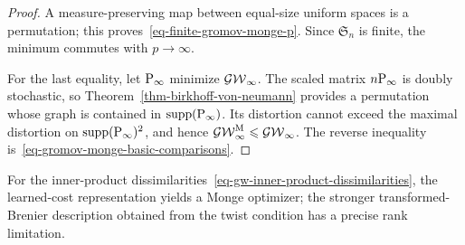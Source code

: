 \begin{proof}
A measure-preserving map between equal-size uniform spaces is a permutation; this proves~\eqref{eq-finite-gromov-monge-p}. Since $\mathfrak S_n$ is finite, the minimum commutes with $p\to\infty$.

For the last equality, let $\P_\infty$ minimize $\GW_\infty$. The scaled matrix $n\P_\infty$ is doubly stochastic, so Theorem~\ref{thm-birkhoff-von-neumann} provides a permutation whose graph is contained in $\supp(\P_\infty)$. Its distortion cannot exceed the maximal distortion on $\supp(\P_\infty)^2$, and hence $\GW_\infty^{\mathrm M}\leq\GW_\infty$. The reverse inequality is~\eqref{eq-gromov-monge-basic-comparisons}.
\end{proof}
For the inner-product dissimilarities~\eqref{eq-gw-inner-product-dissimilarities}, the learned-cost representation yields a Monge optimizer; the stronger transformed-Brenier description obtained from the twist condition has a precise rank limitation.

